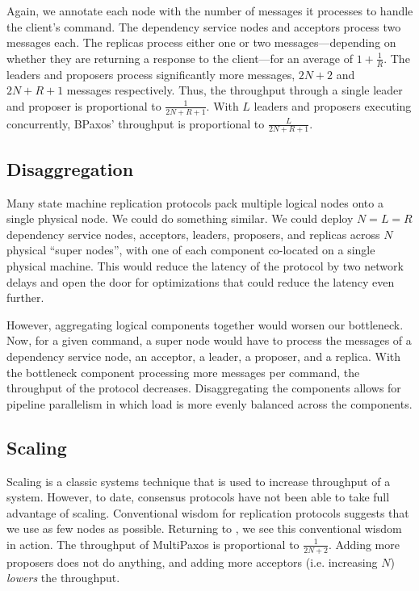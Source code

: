 Again, we annotate each node with the number of messages it processes to handle
the client's command. The dependency service nodes and acceptors process two
messages each. The replicas process either one or two messages---depending on
whether they are returning a response to the client---for an average of
$1+\frac{1}{R}$. The leaders and proposers process significantly more messages,
$2N+2$ and $2N+R+1$ messages respectively. Thus, the throughput through a
single leader and proposer is proportional to $\frac{1}{2N+R+1}$. With $L$
leaders and proposers executing concurrently, BPaxos' throughput is
proportional to $\frac{L}{2N+R+1}$.

\subsection{Disaggregation}
Many state machine replication protocols pack multiple logical nodes onto a
single physical node. We could do something similar. We could deploy $N=L=R$
dependency service nodes, acceptors, leaders, proposers, and replicas across
$N$ physical ``super nodes'', with one of each component co-located on a single
physical machine. This would reduce the latency of the protocol by two network
delays and open the door for optimizations that could reduce the latency even
further.

However, aggregating logical components together would worsen our bottleneck.
Now, for a given command, a super node would have to process the messages of a
dependency service node, an acceptor, a leader, a proposer, and a replica. With
the bottleneck component processing more messages per command, the throughput
of the protocol decreases. Disaggregating the components allows for pipeline
parallelism in which load is more evenly balanced across the components.

\subsection{Scaling}
Scaling is a classic systems technique that is used to increase throughput of a
system. However, to date, consensus protocols have not been able to take
full advantage of scaling. Conventional wisdom for replication protocols
suggests that we use as few nodes as possible. Returning to
, we see this conventional wisdom in action. The
throughput of MultiPaxos is proportional to $\frac{1}{2N+2}$. Adding more
proposers does not do anything, and adding more acceptors (i.e. increasing $N$)
\emph{lowers} the throughput.

